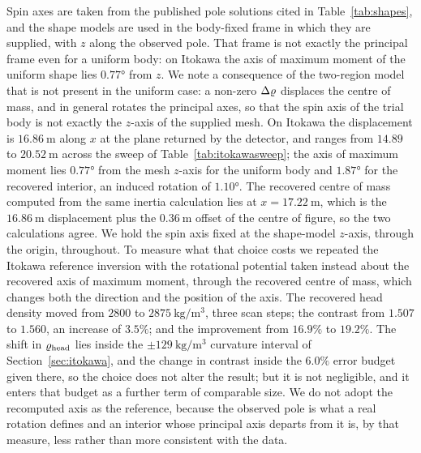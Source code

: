 Spin axes are taken from the published pole solutions cited in
Table~\ref{tab:shapes}, and the shape models are used in the body-fixed frame
in which they are supplied, with $z$ along the observed pole. That frame is not
exactly the principal frame even for a uniform body: on Itokawa the axis of
maximum moment of the uniform shape lies $\ang{0.77}$ from $z$. We note a consequence of
the two-region model that is not present in the uniform case: a non-zero
$\Delta\varrho$ displaces the centre of mass, and in general rotates the
principal axes, so that the spin axis of the trial body is not exactly
the $z$-axis of the supplied mesh. On Itokawa the displacement is
$\SI{16.86}{\metre}$ along $x$ at the plane returned by the detector, and
ranges from $14.89$ to $\SI{20.52}{\metre}$ across the sweep of
Table~\ref{tab:itokawasweep}; the axis of maximum moment lies $\ang{0.77}$ from the mesh $z$-axis for the
uniform body and $\ang{1.87}$ for the recovered interior, an induced rotation
of $\ang{1.10}$. The recovered centre of mass computed from the same inertia
calculation lies at $x = \SI{17.22}{\metre}$, which is the $\SI{16.86}{\metre}$
displacement plus the $\SI{0.36}{\metre}$ offset of the centre of figure, so
the two calculations agree.
We hold the spin axis fixed at the shape-model $z$-axis, through the
origin, throughout. To measure what that choice costs we repeated the Itokawa
reference inversion with the rotational potential taken instead about the
recovered axis of maximum moment, through the recovered centre of mass, which
changes both the direction and the position of the axis. The recovered head
density moved from $2800$ to $\SI{2875}{\kilo\gram\per\cubic\metre}$, three
scan steps; the contrast from $1.507$ to $1.560$, an increase of $3.5\%$; and
the improvement from $16.9\%$ to $19.2\%$. The shift in $\varrho_{\mathrm{head}}$ lies
inside the $\pm\SI{129}{\kilo\gram\per\cubic\metre}$ curvature interval of
Section~\ref{sec:itokawa}, and the change in contrast inside the $6.0\%$
error budget given there, so the choice does not alter the result; but it is
not negligible, and it enters that budget as a further term of comparable
size. We do not adopt the recomputed axis as the reference, because the
observed pole is what a real rotation defines and an interior whose principal
axis departs from it is, by that measure, less rather than more consistent
with the data.

